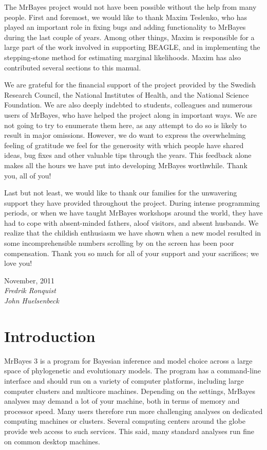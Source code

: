 \documentclass[12pt]{book}
\begin{document}
The MrBayes project would not have been possible without the help from many people. First and
foremost, we would like to thank Maxim Teslenko, who has played an important role in fixing bugs
and adding functionality to MrBayes during the last couple of years. Among other things, Maxim is
responsible for a large part of the work involved in supporting BEAGLE, and in implementing the
stepping-stone method for estimating marginal likelihoods. Maxim has also contributed several
sections to this manual.

We are grateful for the financial support of the project provided by the Swedish Research Council,
the National Institutes of Health, and the National Science Foundation. We are also deeply indebted
to students, colleagues and numerous users of MrBayes, who have helped the project along in
important ways. We are not going to try to enumerate them here, as any attempt to do so is likely
to result in major omissions. However, we do want to express the overwhelming feeling of gratitude
we feel for the generosity with which people have shared ideas, bug fixes and other valuable tips
through the years. This feedback alone makes all the hours we have put into developing MrBayes
worthwhile. Thank you, all of you!

Last but not least, we would like to thank our families for the unwavering support they have
provided throughout the project. During intense programming periods, or when we have taught MrBayes
workshops around the world, they have had to cope with absent-minded fathers, aloof visitors, and
absent husbands. We realize that the childish enthusiasm we have shown when a new model resulted in
some incomprehensible numbers scrolling by on the screen has been poor compensation. Thank you so
much for all of your support and your sacrifices; we love you!

\vspace{1cm}

November, 2011\hfill\\
\textit{Fredrik Ronquist}\hfill\\
\textit{John Huelsenbeck}\hfill\\

\mainmatter

\chapter{Introduction}\label{intro}

MrBayes 3 is a program for Bayesian inference and model choice across a large space of phylogenetic
and evolutionary models. The program has a command-line interface and should run on a variety of
computer platforms, including large computer clusters and multicore machines. Depending on the
settings, MrBayes analyses may demand a lot of your machine, both in terms of memory and processor
speed. Many users therefore run more challenging analyses on dedicated computing machines or
clusters. Several computing centers around the globe provide web access to such services. This
said, many standard analyses run fine on common desktop machines.
\end{document}
